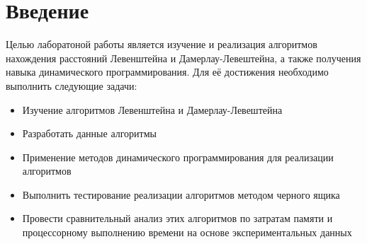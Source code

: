 \chapter*{Введение}

Целью лаборатоной работы является изучение и реализация алгоритмов нахождения расстояний
Левенштейна и Дамерлау-Левештейна, а также получения навыка динамического программирования. Для её достижения необходимо выполнить следующие задачи:
\begin{itemize}
	\item Изучение алгоритмов Левенштейна и Дамерлау-Левештейна
	\item Разработать данные алгоритмы
	\item Применение методов динамического программирования для реализации алгоритмов
	\item Выполнить тестирование реализации алгоритмов методом черного ящика
	\item Провести сравнительный анализ этих алгоритмов по затратам памяти и процессорному выполнению времени на основе экспериментальных данных
\end{itemize}